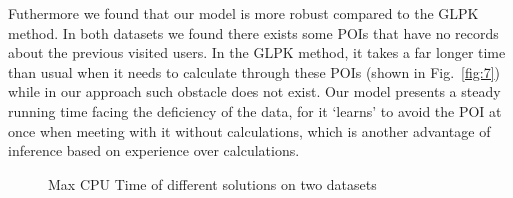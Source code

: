 \documentclass[runningheads]{llncs}
\begin{document}
Futhermore we found that our model is more robust compared to the GLPK method. In both datasets we found there exists some POIs that have no records about the previous visited users. In the GLPK method, it takes a far longer time than usual when it needs to calculate through these POIs (shown in Fig.~\ref{fig:7}) while in our approach such obstacle does not exist. Our model presents a steady running time facing the deficiency of the data, for it `learns' to avoid the POI at once when meeting with it without calculations, which is another advantage of inference based on experience over calculations. 
\begin{figure}[htbp]
	\centering
	\quad
	\caption{Max CPU Time of different solutions on two datasets}
	\label{fig:4}
\end{figure}
\end{document}
